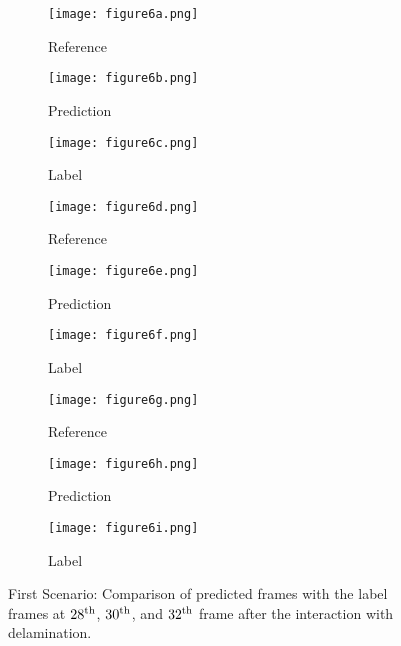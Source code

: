 \begin{figure} [!ht]
	\centering
	\begin{subfigure}[b]{0.32\textwidth}
		\centering
		\texttt{[image: figure6a.png]}
		\caption{Reference}
		\label{fig:first_scenario_ref_28}
	\end{subfigure}
	\hfill
	\begin{subfigure}[b]{0.32\textwidth}
		\centering
		\texttt{[image: figure6b.png]}
		\caption{Prediction}
		\label{fig:first_scenario_pred_28}
	\end{subfigure}
	\hfill
	\begin{subfigure}[b]{0.32\textwidth}
		\centering
		\texttt{[image: figure6c.png]}
		\caption{Label}
		\label{fig:first_scenario_lab_28}
	\end{subfigure}	
	\hfill
	\begin{subfigure}[b]{0.32\textwidth}
		\centering
		\texttt{[image: figure6d.png]}
		\caption{Reference}
		\label{fig:first_scenario_ref_30}
	\end{subfigure}
	\hfill
	\begin{subfigure}[b]{0.32\textwidth}
		\centering
		\texttt{[image: figure6e.png]}
		\caption{Prediction}
		\label{fig:first_scenario_pred_30}
	\end{subfigure}
	\hfill
	\begin{subfigure}[b]{0.32\textwidth}
		\centering
		\texttt{[image: figure6f.png]}
		\caption{Label}
		\label{fig:first_scenario_lab_30}
	\end{subfigure}

	\hfill
	\begin{subfigure}[b]{0.32\textwidth}
		\centering
		\texttt{[image: figure6g.png]}
		\caption{Reference}
		\label{fig:first_scenario_ref_32}
	\end{subfigure}
	\hfill
	\begin{subfigure}[b]{0.32\textwidth}
	\centering
	\texttt{[image: figure6h.png]}
	\caption{Prediction}
	\label{fig:first_scenario_pred_32}
	\end{subfigure}
	\hfill
	\begin{subfigure}[b]{0.32\textwidth}
	\centering
	\texttt{[image: figure6i.png]}
	\caption{Label}
	\label{fig:first_scenario_lab_32}
	\end{subfigure}
	
	\caption{First Scenario: Comparison of predicted frames with the label 
		frames at $28\textsuperscript{th}$, $30\textsuperscript{th}$, and 
		$32\textsuperscript{th}$ frame after the interaction with delamination.}
	\label{fig:first_scenario}
\end{figure}
